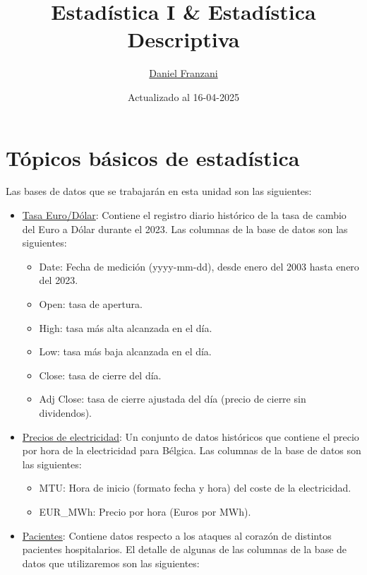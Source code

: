 \documentclass[
  11pt,
]{book}
\title{Estadística I \& Estadística Descriptiva}
\author{\href{https://dfranzani.github.io/website/principal/home.html}{Daniel Franzani}}
\date{Actualizado al 16-04-2025}
\providecommand{\tightlist}{%
  \setlength{\itemsep}{0pt}\setlength{\parskip}{0pt}}
\theoremstyle{definition}
\theoremstyle{definition}
\theoremstyle{definition}
\theoremstyle{definition}
\theoremstyle{remark}
\begin{document}
\maketitle

{
\setcounter{tocdepth}{3}
\tableofcontents
}
\chapter{Tópicos básicos de estadística}\label{unidad1}

Las bases de datos que se trabajarán en esta unidad son las siguientes:

\begin{itemize}
\item
  \label{TasaEURUSD}\href{https://raw.githubusercontent.com/Dfranzani/Bases-de-datos-para-cursos/main/2023-1/Tasa\%2Beuro\%2Bdolar\%2Bhistorica2023.csv}{Tasa Euro/Dólar}: Contiene el registro diario histórico de la tasa de cambio del Euro a Dólar durante el 2023. Las columnas de la base de datos son las siguientes:

  \begin{itemize}
  \tightlist
  \item
    Date: Fecha de medición (yyyy-mm-dd), desde enero del 2003 hasta enero del 2023.
  \item
    Open: tasa de apertura.
  \item
    High: tasa más alta alcanzada en el día.
  \item
    Low: tasa más baja alcanzada en el día.
  \item
    Close: tasa de cierre del día.
  \item
    Adj Close: tasa de cierre ajustada del día (precio de cierre sin dividendos).
  \end{itemize}
\item
  \label{PreciosElectricidad}\href{https://raw.githubusercontent.com/Dfranzani/Bases-de-datos-para-cursos/main/2024-1/Belgian\%20Electricity\%20Prices.csv}{Precios de electricidad}: Un conjunto de datos históricos que contiene el precio por hora de la electricidad para Bélgica. Las columnas de la base de datos son las siguientes:

  \begin{itemize}
  \tightlist
  \item
    MTU: Hora de inicio (formato fecha y hora) del coste de la electricidad.
  \item
    EUR\_MWh: Precio por hora (Euros por MWh).
  \end{itemize}
\item
  \label{Pacientes}\href{https://raw.githubusercontent.com/Dfranzani/Bases-de-datos-para-cursos/main/2023-1/Heart+complete.csv}{Pacientes}: Contiene datos respecto a los ataques al corazón de distintos pacientes hospitalarios. El detalle de algunas de las columnas de la base de datos que utilizaremos son las siguientes:


\end{itemize}
\end{document}
